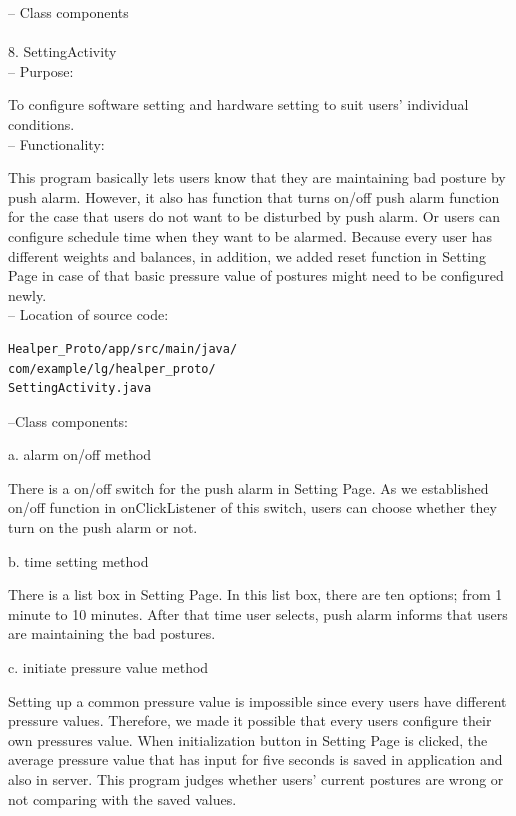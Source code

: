 \documentclass[conference]{IEEEtran}
\begin{document}
 -- Class components\\\\
 
8.	SettingActivity\\

 --	Purpose:

To configure software setting and hardware setting to suit users' individual conditions. \\

 --	Functionality:

This program basically lets users know that they are maintaining bad posture by push alarm. However, it also has  function that turns on/off push alarm function for the case that users do not want to be disturbed by push alarm. Or users can configure schedule time when they want to be alarmed. Because every user has different weights and balances, in addition, we added reset function in Setting Page in case of that basic pressure value of postures might need to be configured newly. \\

 -- Location of source code:

\begin{verbatim}
Healper_Proto/app/src/main/java/
com/example/lg/healper_proto/
SettingActivity.java
\end{verbatim}

 --Class components:

a.	alarm on/off method

There is a on/off switch for the push alarm in Setting Page. As we established on/off function in onClickListener of this switch, users can choose whether they turn on the push alarm or not.

b. time setting method

There is a list box in Setting Page. In this list box, there are ten options; from 1 minute to 10 minutes. After that time user selects, push alarm informs that users are maintaining the bad postures.
 
c. initiate pressure value method

Setting up a common pressure value is impossible since every users have different pressure values. Therefore, we made it possible that every users configure their own pressures value. When initialization button in Setting Page is clicked, the average pressure value that has input for five seconds is saved in application and also in server. This program judges whether users' current postures are wrong or not comparing with the saved values. \\\\\\
\end{document}
